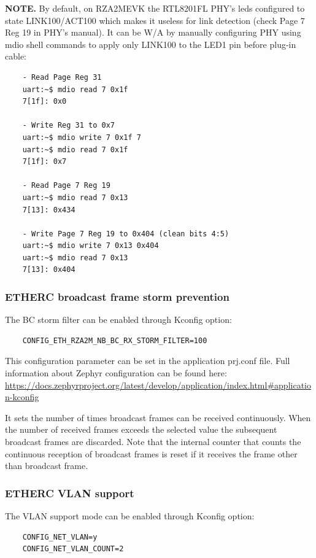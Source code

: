 \documentclass[11pt,a4paper,oneside]{article}
\begin{document}
\textbf{NOTE.}
By default, on RZA2MEVK the RTL8201FL PHY's leds configured to state LINK100/ACT100 which makes it useless for link detection (check Page 7 Reg 19 in PHY's manual).
It can be W/A by manually configuring PHY using mdio shell commands to apply only LINK100 to the LED1 pin before plug-in cable:

\begin{lstlisting}
	- Read Page Reg 31
	uart:~$ mdio read 7 0x1f
	7[1f]: 0x0

	- Write Reg 31 to 0x7
	uart:~$ mdio write 7 0x1f 7
	uart:~$ mdio read 7 0x1f
	7[1f]: 0x7

	- Read Page 7 Reg 19
	uart:~$ mdio read 7 0x13
	7[13]: 0x434

	- Write Page 7 Reg 19 to 0x404 (clean bits 4:5)
	uart:~$ mdio write 7 0x13 0x404
	uart:~$ mdio read 7 0x13
	7[13]: 0x404
\end{lstlisting}

\subsubsection{ETHERC broadcast frame storm prevention}\label{eth-bc-filter-support}

The BC storm filter can be enabled through Kconfig option:
\begin{lstlisting}
	CONFIG_ETH_RZA2M_NB_BC_RX_STORM_FILTER=100
\end{lstlisting}

\label{prj.conf} This configuration parameter can be set in the application prj.conf file.
Full information about Zephyr configuration can be found here:
\url{https://docs.zephyrproject.org/latest/develop/application/index.html#application-kconfig}

It sets the number of times broadcast frames can be received continuously.
When the number of received frames exceeds the selected value the subsequent broadcast frames are discarded.
Note that the internal counter that counts the continuous reception of broadcast frames is reset if it receives the frame other than broadcast frame.

\subsubsection{ETHERC VLAN support}\label{eth-vlan-support}

The VLAN support mode can be enabled through Kconfig option:
\begin{lstlisting}
	CONFIG_NET_VLAN=y
	CONFIG_NET_VLAN_COUNT=2
\end{lstlisting}
\end{document}
